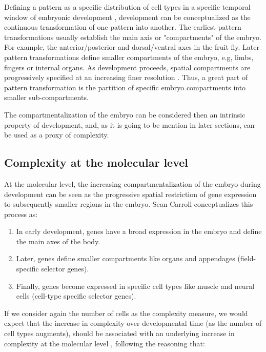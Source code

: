Defining a pattern as a specific distribution of cell types in a specific temporal window of embryonic development \citep{Salazar-Ciudad2004}, development can be conceptualized as the continuous transformation of one pattern into another.
The earliest pattern transformations usually establish the main axis or "compartments" of the embryo. For example, the anterior/posterior and dorsal/ventral axes in the fruit fly.
Later pattern transformations define smaller compartments of the embryo, e.g, limbs, fingers  or internal organs.
As development proceeds, spatial compartments are progressively specified at an increasing finer resolution \citep{Davidson2001}.
Thus, a great part of pattern transformation is the partition of specific embryo compartments into smaller sub-compartments.

The compartmentalization of the embryo can be considered then an intrinsic property of development, and, as it is going to be mention in later sections, can be used as a proxy of complexity.

\subsection{Complexity at the molecular level}

At the molecular level, the increasing compartmentalization of the embryo during development can be seen as the progressive spatial restriction of gene expression to subsequently smaller regions in the embryo.
Sean Carroll conceptualizes this process\citep{Carroll2001} as:
\begin{enumerate}
\item In early development, genes have a broad expression in the embryo and define the main axes of the body.
\item Later, genes define smaller compartments like organs and appendages (field-specific selector genes).
\item Finally, genes become expressed in specific cell types like muscle and neural cells (cell-type specific selector genes). 
\end{enumerate}

If we consider again the number of cells as the complexity measure, we would expect that the increase in complexity over developmental time (as the number of cell types augments), should be associated with an underlying increase in complexity at the molecular level \citep{Arthur2010}, following the reasoning that:

